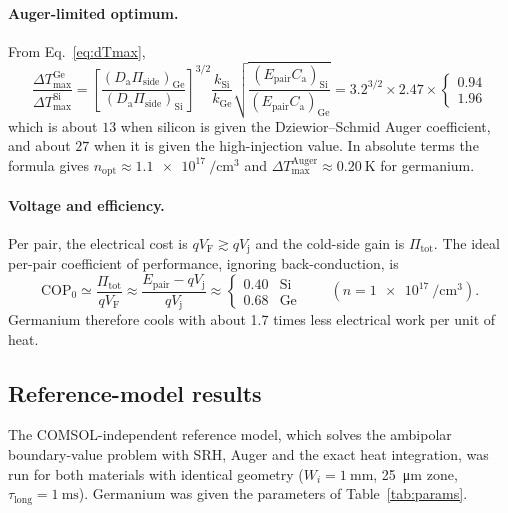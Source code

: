 \documentclass[11pt,a4paper]{article}
\newcommand{\Ep}{E_{\mathrm{pair}}}
\newcommand{\Vj}{V_{\mathrm{j}}}
\newcommand{\VF}{V_{\mathrm{F}}}
\newcommand{\Da}{D_{\mathrm{a}}}
\newcommand{\Ca}{C_{\mathrm{a}}}
\newcommand{\Pis}{\Pi_{\mathrm{side}}}
\newcommand{\Pit}{\Pi_{\mathrm{tot}}}
\begin{document}
\paragraph{Auger-limited optimum.} From Eq.~\eqref{eq:dTmax},
\begin{equation}
  \frac{\Delta T^{\mathrm{Ge}}_{\max}}{\Delta T^{\mathrm{Si}}_{\max}}
  =\left[\frac{(\Da\Pis)_{\mathrm{Ge}}}{(\Da\Pis)_{\mathrm{Si}}}\right]^{3/2}
   \frac{k_{\mathrm{Si}}}{k_{\mathrm{Ge}}}
   \sqrt{\frac{(\Ep\Ca)_{\mathrm{Si}}}{(\Ep\Ca)_{\mathrm{Ge}}}}
  = 3.2^{3/2}\times2.47\times\begin{cases}0.94\\ 1.96\end{cases}
\end{equation}
which is about $13$ when silicon is given the Dziewior--Schmid Auger coefficient, and about $27$ when it is given the high-injection value.
In absolute terms the formula gives $n_{\mathrm{opt}}\approx\SI{1.1e17}{\per\centi\metre\cubed}$ and $\Delta T^{\mathrm{Auger}}_{\max}\approx\SI{0.20}{\kelvin}$ for germanium.

\paragraph{Voltage and efficiency.} Per pair, the electrical cost is $q\VF\gtrsim q\Vj$ and the cold-side gain is $\Pit$. The ideal per-pair coefficient of performance, ignoring back-conduction, is
\begin{equation}
  \mathrm{COP}_0\simeq\frac{\Pit}{q\VF}\approx\frac{\Ep-q\Vj}{q\Vj}
  \approx\begin{cases}0.40 & \text{Si}\\ 0.68 & \text{Ge}\end{cases}\qquad(n=\SI{1e17}{\per\centi\metre\cubed}).
\end{equation}
Germanium therefore cools with about 1.7 times less electrical work per unit of heat.

\subsection{Reference-model results}
The COMSOL-independent reference model, which solves the ambipolar boundary-value problem with SRH, Auger and the exact heat integration, was run for both materials with identical geometry ($W_i=\SI{1}{\milli\metre}$, \SI{25}{\micro\metre} zone, $\tau_{\mathrm{long}}=\SI{1}{\milli\second}$). Germanium was given the parameters of Table~\ref{tab:params}.
\end{document}

